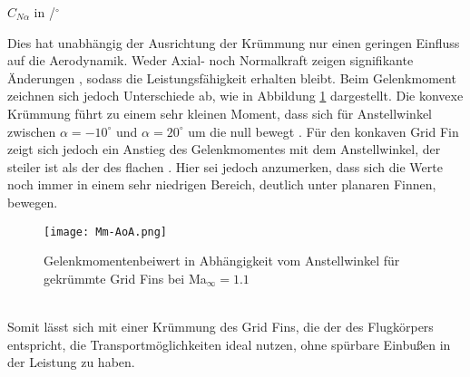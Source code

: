 $C_{N\alpha}$ in /$^\circ$

Dies hat unabhängig der Ausrichtung der Krümmung nur einen geringen Einfluss auf die Aerodynamik. Weder Axial- noch Normalkraft zeigen signifikante Änderungen \cite{LambdaKonf}, sodass die Leistungsfähigkeit erhalten bleibt. Beim Gelenkmoment zeichnen sich jedoch Unterschiede ab, wie in Abbildung \ref{abb_krumm} dargestellt. Die konvexe Krümmung führt zu einem sehr kleinen Moment, dass sich für Anstellwinkel zwischen $\alpha = -10^\circ$ und $\alpha=20^\circ$ um die null bewegt \cite{LambdaKonf}. Für den konkaven Grid Fin zeigt sich jedoch ein Anstieg des Gelenkmomentes mit dem Anstellwinkel, der steiler ist als der des flachen \cite{LambdaKonf}. Hier sei jedoch anzumerken, dass sich die Werte noch immer in einem sehr niedrigen Bereich, deutlich unter planaren Finnen, bewegen.
\begin{figure}[h]
	\centering
	\texttt{[image: Mm-AoA.png]}
	\begin{flushright}
	\end{flushright}
	\caption{Gelenkmomentenbeiwert in Abhängigkeit vom Anstellwinkel für gekrümmte Grid Fins bei Ma$_\infty=1.1$}
	\label{abb_krumm}
\end{figure}\\
Somit lässt sich mit einer Krümmung des Grid Fins, die der des Flugkörpers entspricht, die Transportmöglichkeiten ideal nutzen, ohne spürbare Einbußen in der Leistung zu haben.

